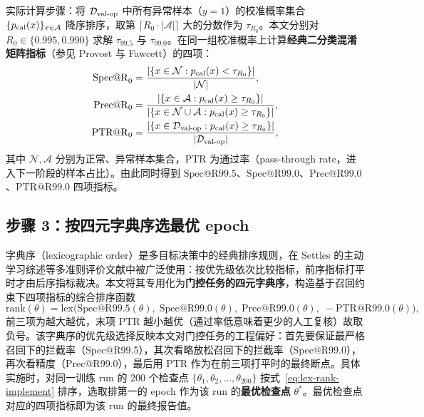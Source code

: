 \documentclass[UTF8,openany,12pt]{ctexbook}
\begin{document}
实际计算步骤：将 $\mathcal{D}_{\rm val\text{-}op}$ 中所有异常样本（$y = 1$）的校准概率集合 $\{p_{\rm cal}(x)\}_{x \in \mathcal{A}}$ 降序排序，取第 $\lceil R_0 \cdot |\mathcal{A}| \rceil$ 大的分数作为 $\tau_{R_0}$。本文分别对 $R_0 \in \{0.995, 0.990\}$ 求解 $\tau_{99.5}$ 与 $\tau_{99.0}$。在同一组校准概率上计算\textbf{经典二分类混淆矩阵指标}（参见 Provost 与 Fawcett\cite{provost2001robust}）的四项：
\begin{align}
\mathrm{Spec@R}_0 &= \frac{|\{x \in \mathcal{N} : p_{\rm cal}(x) < \tau_{R_0}\}|}{|\mathcal{N}|}, \label{eq:spec-implement}\\
\mathrm{Prec@R}_0 &= \frac{|\{x \in \mathcal{A} : p_{\rm cal}(x) \geq \tau_{R_0}\}|}{|\{x \in \mathcal{N} \cup \mathcal{A} : p_{\rm cal}(x) \geq \tau_{R_0}\}|}, \label{eq:prec-implement}\\
\mathrm{PTR@R}_0 &= \frac{|\{x \in \mathcal{D}_{\rm val\text{-}op} : p_{\rm cal}(x) \geq \tau_{R_0}\}|}{|\mathcal{D}_{\rm val\text{-}op}|}, \label{eq:ptr-implement}
\end{align}
其中 $\mathcal{N}, \mathcal{A}$ 分别为正常、异常样本集合，PTR 为通过率（pass-through rate，进入下一阶段的样本占比）。由此同时得到 $\mathrm{Spec@R99.5}$、$\mathrm{Spec@R99.0}$、$\mathrm{Prec@R99.0}$、$\mathrm{PTR@R99.0}$ 四项指标。

\subsection{步骤 3：按四元字典序选最优 epoch}
字典序（lexicographic order）是多目标决策中的经典排序规则，在 Settles\cite{settles2009active} 的主动学习综述等多准则评价文献中被广泛使用：按优先级依次比较指标，前序指标打平时才由后序指标裁决。本文将其专用化为\textbf{门控任务的四元字典序}，构造基于召回约束下四项指标的综合排序函数
\begin{equation}
\mathrm{rank}(\theta) = \mathrm{lex}\bigl(\mathrm{Spec@R99.5}(\theta),\; \mathrm{Spec@R99.0}(\theta),\; \mathrm{Prec@R99.0}(\theta),\; -\mathrm{PTR@R99.0}(\theta)\bigr),
\label{eq:lex-rank-implement}
\end{equation}
前三项为越大越优，末项 PTR 越小越优（通过率低意味着更少的人工复核）故取负号。该字典序的优先级选择反映本文对门控任务的工程偏好：首先要保证最严格召回下的拦截率（Spec@R99.5），其次看略放松召回下的拦截率（Spec@R99.0），再次看精度（Prec@R99.0），最后用 PTR 作为在前三项打平时的最终断点。具体实施时，对同一训练 run 的 200 个检查点 $\{\theta_1, \theta_2, \ldots, \theta_{200}\}$ 按式~\eqref{eq:lex-rank-implement} 排序，选取排第一的 epoch 作为该 run 的\textbf{最优检查点} $\theta^{\ast}$。最优检查点对应的四项指标即为该 run 的最终报告值。
\end{document}
